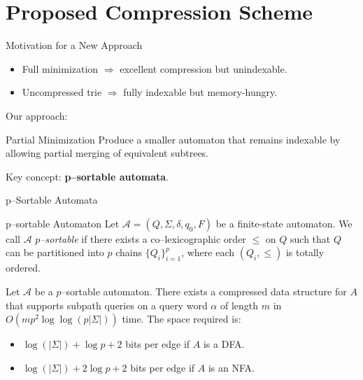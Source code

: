 \documentclass[aspectratio=169]{beamer}
\begin{document}

\section{Proposed Compression Scheme}
\begin{frame}{Motivation for a New Approach}
  \begin{itemize}
    \item Full minimization $\Rightarrow$ excellent compression but unindexable.
    \item Uncompressed trie $\Rightarrow$ fully indexable but memory-hungry.
  \end{itemize}
  
  \vspace{0.3cm}
  Our approach:
      \begin{block}{Partial Minimization}
      Produce a smaller automaton that remains indexable
      by allowing partial merging of equivalent subtrees.
      \end{block}
  Key concept: \textbf{p–sortable automata}.
\end{frame}

\begin{frame}{p–Sortable Automata}

\begin{block}{p–sortable Automaton}
  Let $\mathcal{A} = (Q, \Sigma, \delta, q_0, F)$ be a finite-state automaton. We call $\mathcal{A}$ \emph{$p$--sortable} if there exists a co--lexicographic order $\leq$ on $Q$ such that $Q$ can be partitioned into $p$ chains $\{Q_i\}_{i=1}^p$, where each $(Q_i, \leq)$ is totally ordered.
\end{block}

Let $\mathcal{A}$ be a $p$--sortable automaton. There exists a compressed data structure for $A$ that supports subpath queries on a query word $\alpha$ of length $m$ in $O(mp^2\log\log(p|\Sigma|))$ time. The space required is:
\begin{itemize}
  \item $\log(|\Sigma|) + \log p + 2$ bits per edge if $A$ is a DFA.
  \item $\log(|\Sigma|) + 2\log p + 2$ bits per edge if $A$ is an NFA.
\end{itemize}

\end{frame}
\end{document}
